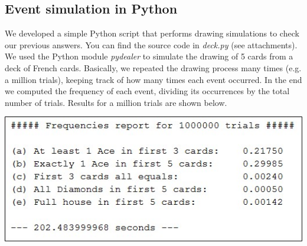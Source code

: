 \subsection{Event simulation in Python}
We developed a simple Python script that performs drawing simulations to check our previous answers. You can find the source code in \textit{deck.py} (see attachments).
We used the Python module \textit{pydealer}\cite{pydealer} to simulate the drawing of 5 cards from a deck of French cards. Basically, we repeated the drawing process many times (e.g. a million trials), keeping track of how many times each event occurred.
In the end we computed the frequency of each event, dividing its occurrences by the total number of trials.
Results for a million trials are shown below.
\begin{center}
	\vspace{5mm}
	\includegraphics[scale=0.8]{img/deck.jpg}
\end{center}
